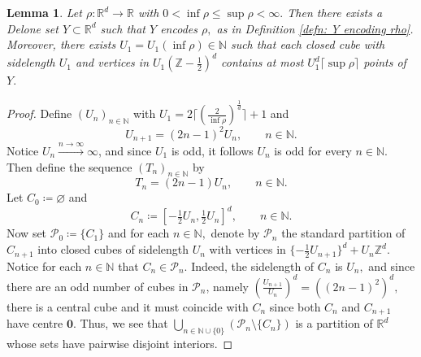 \documentclass{article}
\newtheorem{lemma}[define]{Lemma}
\newcommand{\R}{\mathbb{R}}
\newcommand{\Z}{\mathbb{Z}}
\newcommand{\N}{\mathbb{N}}
\begin{document}
    \begin{lemma} \label{lemma: Y encodes rho} Let $\rho:\R^d \to \R$ with $0< \inf \rho \leq \sup \rho < \infty.$ Then there exists a Delone set $Y \subset \R^d$ such that $Y$ encodes $\rho,$ as in Definition \ref{defn: Y encoding rho}. Moreover, there exists $U_1 = U_1(\inf\rho) \in \N$ such that each closed cube with sidelength $U_1$ and vertices in $U_1(\Z-\frac{1}{2})^d$ contains at most $U_1^d\lceil \sup \rho \rceil$ points of $Y.$
    \end{lemma}
    \begin{proof}
        Define $(U_n)_{n \in \N}$ with $U_1 = 2\lceil (\frac{2}{\inf \rho})^\frac{1}{d}\rceil+1$ and 
    \begin{equation*}
        U_{n+1} = (2n-1)^2U_n, \qquad n \in \N.
    \end{equation*} Notice $U_n \xrightarrow{n \to \infty} \infty$, and since $U_1$ is odd, it follows $U_n$ is odd for every $n \in \N$. 
    Then define the sequence $(T_n)_{n \in \N}$ by $$T_n = (2n-1)U_n,\qquad n \in \N.$$  
    Let $C_0 \coloneqq \varnothing$ and $$C_n \coloneqq \left[-\tfrac{1}{2}U_{n},\tfrac{1}{2}U_{n}\right]^d, \qquad n \in \N.$$
    Now set $\mathcal{P}_0\coloneqq \{C_1\}$ and for each $n \in \N,$ denote by $\mathcal{P}_n$ the standard partition of $C_{n+1}$ into closed cubes of sidelength $U_n$ with vertices in ${\{-\frac{1}{2}}U_{n+1}\}^d+U_n\Z^d$.  Notice for each $n \in \N$ that $C_n \in \mathcal{P}_n$. Indeed, the sidelength of $C_n$ is $U_n,$ and since there are an odd number of cubes in $\mathcal{P}_n$, namely $(\frac{U_{n+1}}{U_n})^d = ((2n-1)^2)^d,$ there is a central cube and it must coincide with $C_n$ since both $C_n$ and $C_{n+1}$ have centre $\textbf{0}$. Thus, we see that $\bigcup_{n \in \N \cup \{0\}} (\mathcal{P}_n\setminus \{C_n\})$ is a partition of $\R^d$ whose sets have pairwise disjoint interiors.
    

\end{proof}
\end{document}
